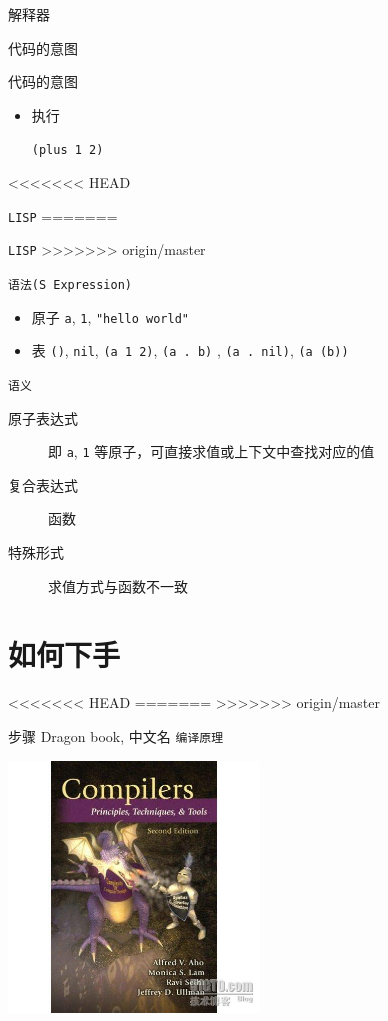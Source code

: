 \documentclass[presentation, bigger]{beamer}
\begin{document}
\begin{frame}[label={sec:org106539d},fragile]{解释器}
\begin{frame}[label={sec:org3020c49},fragile]{代码的意图}
\begin{frame}[fragile,label={sec:orgf3baafe}]{代码的意图}
\begin{itemize}
\item 执行

\texttt{(plus 1 2)}
\end{itemize}
\end{frame}

<<<<<<< HEAD
\begin{frame}[label={sec:org3aa0441},fragile]{\texttt{LISP}}
=======
\begin{frame}[fragile,label={sec:org17ed4b8}]{\texttt{LISP}}
>>>>>>> origin/master
 \begin{block}{\texttt{语法(S Expression)}}
\begin{itemize}
\item 原子 \texttt{a}, \texttt{1}, \texttt{"hello world"}
\item 表 \texttt{()}, \texttt{nil}, \texttt{(a 1 2)}, \texttt{(a . b)} , \texttt{(a . nil)}, \texttt{(a (b))}
\end{itemize}
\end{block}
\begin{block}{\texttt{语义}}
\begin{description}
\item[{原子表达式}] 即 \texttt{a}, \texttt{1} 等原子，可直接求值或上下文中查找对应的值
\item[{复合表达式}] 函数
\item[{特殊形式}] 求值方式与函数不一致
\end{description}
\end{block}
\end{frame}

\section{如何下手}
<<<<<<< HEAD
\label{sec:orgdf880a7}
=======
\label{sec:org58d33f0}
>>>>>>> origin/master
\begin{frame}[fragile,allowframebreaks,label=]{步骤}
 \alert{Dragon book}, 中文名 \texttt{编译原理}
\begin{center}
\includegraphics[width=0.5\textwidth]{./img/dragon.jpg}
\end{center}


\end{frame}
\end{frame}
\end{frame}
\end{frame}
\end{document}
